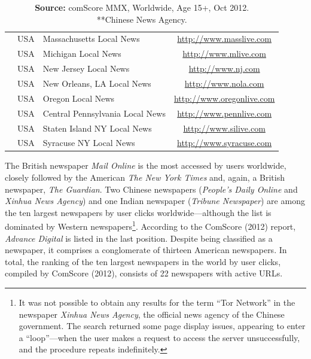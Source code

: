 \begin{table}[ht]
\begin{tabular}{lllc}
        & USA & Massachusetts Local News        & \url{http://www.masslive.com} \\
        & USA & Michigan Local News             & \url{http://www.mlive.com} \\
        & USA & New Jersey Local News           & \url{http://www.nj.com} \\
        & USA & New Orleans, LA Local News      & \url{http://www.nola.com} \\
        & USA & Oregon Local News               & \url{http://www.oregonlive.com} \\
        & USA & Central Pennsylvania Local News & \url{http://www.pennlive.com} \\
        & USA & Staten Island NY Local News     & \url{http://www.silive.com} \\
        & USA & Syracuse NY Local News          & \url{http://www.syracuse.com} \\
        \bottomrule
    \end{tabular}

    \caption*{\textbf{Source:} comScore MMX, Worldwide, Age 15+, Oct 2012.\\
    **Chinese News Agency.}
    
    \label{tab:top_newspapers}
\end{table}



The British newspaper \textit{Mail Online} is the most accessed by users worldwide, closely followed by the American \textit{The New York Times} and, again, a British newspaper, \textit{The Guardian}. Two Chinese newspapers (\textit{People's Daily Online} and \textit{Xinhua News Agency}) and one Indian newspaper (\textit{Tribune Newspaper}) are among the ten largest newspapers by user clicks worldwide—although the list is dominated by Western newspapers\footnote{It was not possible to obtain any results for the term “Tor Network” in the newspaper \textit{Xinhua News Agency}, the official news agency of the Chinese government. The search returned some page display issues, appearing to enter a “loop”—when the user makes a request to access the server unsuccessfully, and the procedure repeats indefinitely.
}. According to the ComScore (2012) report, \textit{Advance Digital} is listed in the last position. Despite being classified as a newspaper, it comprises a conglomerate of thirteen American newspapers. In total, the ranking of the ten largest newspapers in the world by user clicks, compiled by ComScore (2012), consists of 22 newspapers with active URLs.

